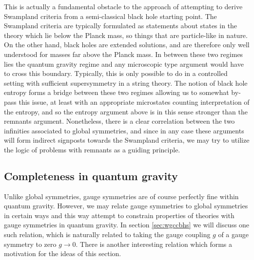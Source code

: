 \documentclass[11pt,a4paper]{article}
\numberwithin{equation}{section}
\numberwithin{table}{section}\setlength{\multlinegap}{25pt}
\begin{document}
This is actually a fundamental obstacle to the approach of attempting to derive Swampland criteria from a semi-classical black hole starting point. The Swampland criteria are typically formulated as statements about states in the theory which lie below the Planck mass, so things that are particle-like in nature. On the other hand, black holes are extended solutions, and are therefore only well understood for masses far above the Planck mass. In between these two regimes lies the quantum gravity regime and any microscopic type argument would have to cross this boundary. Typically, this is only possible to do in a controlled setting with sufficient supersymmetry in a string theory. The notion of black hole entropy forms a bridge between these two regimes allowing us to somewhat by-pass this issue, at least with an appropriate microstates counting interpretation of the entropy, and so the entropy argument above is in this sense stronger than the remnants argument. Nonetheless, there is a clear correlation between the two infinities associated to global symmetries, and since in any case these arguments will form indirect signposts towards the Swampland criteria, we may try to utilize the logic of problems with remnants as a guiding principle. 

\subsection{Completeness in quantum gravity}
\label{sec:complconj}

Unlike global symmetries, gauge symmetries are of course perfectly fine within quantum gravity. However, we may relate gauge symmetries to global symmetries in certain ways and this way attempt to constrain properties of theories with gauge symmetries in quantum gravity. In section \ref{sec:wgccbhs} we will discuss one such relation, which is naturally related to taking the gauge coupling $g$ of a gauge symmetry to zero $g \rightarrow 0$. There is another interesting relation which forms a motivation for the ideas of this section. 
\end{document}
